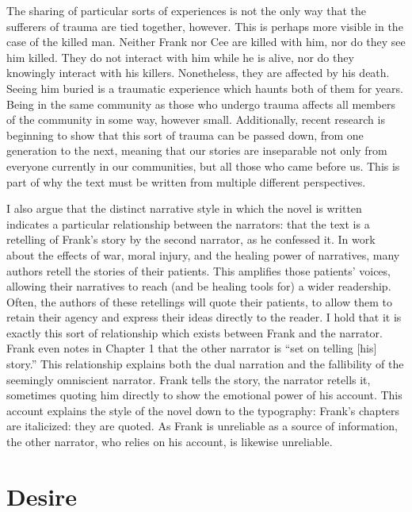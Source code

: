 \documentclass[12pt]{article}
\begin{document}
The sharing of particular sorts of experiences is not the only way that the
sufferers of trauma are tied together, however. This is perhaps more visible in
the case of the killed man. Neither Frank nor Cee are killed with him, nor do
they see him killed. They do not interact with him while he is alive, nor do
they knowingly interact with his killers. Nonetheless, they are affected by his
death. Seeing him buried is a traumatic experience which haunts both of them
for years. Being in the same community as those who undergo trauma affects all
members of the community in some way, however small. Additionally, recent
research is beginning to show that this sort of trauma can be passed down, from
one generation to the next,\autocite{Dias14,Love10} meaning that our stories
are inseparable not only from everyone currently in our communities, but all
those who came before us. This is part of why the text must be written from
multiple different perspectives.

I also argue that the distinct narrative style in which the novel is written
indicates a particular relationship between the narrators: that the text is a
retelling of Frank's story by the second narrator, as he confessed it. In work
about the effects of war, moral injury, and the healing power of narratives,
many authors retell the stories of their
patients.\autocite{Shay95,vanDernoot09,Brock15,Charon06} This amplifies those
patients' voices, allowing their narratives to reach (and be healing tools for)
a wider readership. Often, the authors of these retellings will quote their
patients, to allow them to retain their agency and express their ideas directly
to the reader. I hold that it is exactly this sort of relationship which exists
between Frank and the narrator. Frank even notes in Chapter 1 that the other
narrator is ``set on telling [his] story.''\autocite[p.~6]{Morrison12} This
relationship explains both the dual narration and the fallibility of the
seemingly omniscient narrator. Frank tells the story, the narrator retells it,
sometimes quoting him directly to show the emotional power of his account. This
account explains the style of the novel down to the typography: Frank's
chapters are italicized: they are quoted. As Frank is unreliable as a source of
information, the other narrator, who relies on his account, is likewise
unreliable.

\section{Desire}
\end{document}
